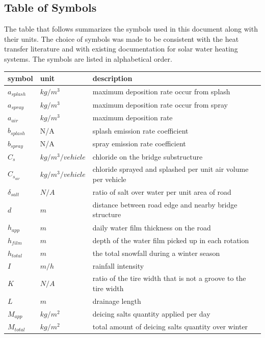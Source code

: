 \documentclass[12pt]{article}
\begin{document}
\subsection{Table of Symbols}

The table that follows summarizes the symbols used in this document along with
their units.  The choice of symbols was made to be consistent with the heat
transfer literature and with existing documentation for solar water heating
systems.  The symbols are listed in alphabetical order.

\break
\break

\renewcommand{\arraystretch}{1.2}
\noindent \begin{longtable*}{l l p{12cm}} \toprule
\textbf{symbol} & \textbf{unit} & \textbf{description}\\
\midrule 
$a_{splash}$ & $kg/m^3$ & maximum deposition rate occur from splash\\
$a_{spray}$ & $kg/m^3$ & maximum deposition rate occur from spray\\
$a_{air}$ & $kg/m^3$ & maximum deposition rate\\
$b_{splash}$ & N/A & splash emission rate coefficient\\
$b_{spray}$ & N/A & spray emission rate coefficient\\
$C_s$ & $kg/m^3/vehicle$ & chloride on the bridge substructure\\
$C_{s_{air}}$ & $kg/m^3/vehicle$ & chloride sprayed and splashed per unit air volume per vehicle\\
$\delta_{salt}$ & $N/A$ & ratio of salt over water per unit area of road\\
$d$ & $m$ & distance between road edge and nearby bridge structure\\
$h_{app}$ & $m$ & daily water film thickness on the road\\
$h_{film}$ & $m$ & depth of the water film picked up in each rotation\\
$h_{total}$ & $m$ & the total snowfall during a winter season\\
$I$ & $m/h$ & rainfall intensity\\
$K$ & $N/A$ & ratio of the tire width that is not a groove to the tire width\\
$L$ & $m$ & drainage length\\
$M_{app}$ & $kg/m^2$ & deicing salts quantity applied per day\\
$M_{total}$ & $kg/m^2$ & total amount of deicing salts quantity over winter\\

\end{longtable*}
\end{document}

